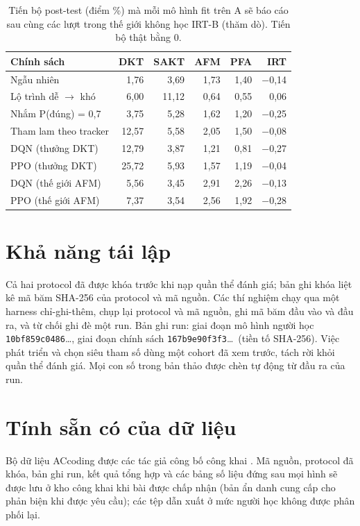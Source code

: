 \documentclass[a4paper,preprint,12pt,authoryear]{elsarticle}
\begin{document}
\begin{table}[H]
\centering
\caption{Tiến bộ post-test (điểm \%) mà mỗi mô hình fit trên A sẽ báo cáo sau cùng các lượt trong thế giới không học IRT-B (thăm dò). Tiến bộ thật bằng 0.}
\label{tab:observers}
\small
\begin{tabular}{lrrrrr}
\toprule
Chính sách & DKT & SAKT & AFM & PFA & IRT \\
\midrule
Ngẫu nhiên & 1{,}76 & 3{,}69 & 1{,}73 & 1{,}40 & $-$0{,}14 \\
Lộ trình dễ $\to$ khó & 6{,}00 & 11{,}12 & 0{,}64 & 0{,}55 & 0{,}06 \\
Nhắm P(đúng) = 0{,}7 & 3{,}75 & 5{,}28 & 1{,}62 & 1{,}20 & $-$0{,}25 \\
Tham lam theo tracker & 12{,}57 & 5{,}58 & 2{,}05 & 1{,}50 & $-$0{,}08 \\
DQN (thưởng DKT) & 12{,}79 & 3{,}87 & 1{,}21 & 0{,}81 & $-$0{,}27 \\
PPO (thưởng DKT) & 25{,}72 & 5{,}93 & 1{,}57 & 1{,}19 & $-$0{,}04 \\
DQN (thế giới AFM) & 5{,}56 & 3{,}45 & 2{,}91 & 2{,}26 & $-$0{,}13 \\
PPO (thế giới AFM) & 7{,}37 & 3{,}54 & 2{,}56 & 1{,}92 & $-$0{,}28 \\
\bottomrule
\end{tabular}
\end{table}

\section{Khả năng tái lập}\label{app:repro}

Cả hai protocol đã được khóa trước khi nạp quần thể đánh giá; bản ghi khóa liệt kê mã băm SHA-256 của protocol và mã nguồn. Các thí nghiệm chạy qua một harness chỉ-ghi-thêm, chụp lại protocol và mã nguồn, ghi mã băm đầu vào và đầu ra, và từ chối ghi đè một run. Bản ghi run: giai đoạn mô hình người học \texttt{10bf859c0486}\ldots, giai đoạn chính sách \texttt{167b9e90f3f3}\ldots\ (tiền tố SHA-256). Việc phát triển và chọn siêu tham số dùng một cohort đã xem trước, tách rời khỏi quần thể đánh giá. Mọi con số trong bản thảo được chèn tự động từ đầu ra của run.

\section*{Tính sẵn có của dữ liệu}
Bộ dữ liệu ACcoding được các tác giả công bố công khai \citep{sun2026accodingdata,chen2024accoding}. Mã nguồn, protocol đã khóa, bản ghi run, kết quả tổng hợp và các bảng số liệu đứng sau mọi hình sẽ được lưu ở kho công khai khi bài được chấp nhận (bản ẩn danh cung cấp cho phản biện khi được yêu cầu); các tệp dẫn xuất ở mức người học không được phân phối lại.
\end{document}
